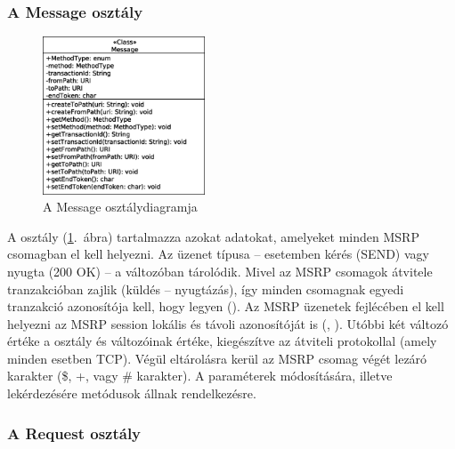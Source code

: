 \newpage
\subsubsection*{A Message osztály}
\label{sec:msrp_message}

\begin{figure}
  \vspace{-55pt}
  \begin{center}
    \includegraphics[width=0.43\textwidth]{img/class_diagrams/Message.eps}
  \end{center}
  \vspace{-15pt}
  \captionsetup{font=scriptsize}
  \caption{A Message osztálydiagramja}
   \label{fig:class_message}
  \vspace{-10pt}
\end{figure}
A  osztály (\ref{fig:class_message}.~ábra) tartalmazza azokat adatokat, amelyeket minden MSRP csomagban el kell helyezni. Az üzenet típusa -- esetemben kérés (SEND) vagy nyugta (200 OK) -- a  változóban tárolódik. Mivel az MSRP csomagok átvitele tranzakcióban zajlik (küldés -- nyugtázás), így minden csomagnak egyedi tranzakció azonosítója kell, hogy legyen (). Az MSRP üzenetek fejlécében el kell helyezni az MSRP session lokális és távoli azonosítóját is (, ). Utóbbi két változó értéke a  osztály  és  változóinak értéke, kiegészítve az átviteli protokollal (amely minden esetben TCP). Végül eltárolásra kerül az MSRP csomag végét lezáró karakter (\$, +, vagy  \# karakter). A paraméterek módosítására, illetve lekérdezésére metódusok állnak rendelkezésre.

\subsubsection*{A Request osztály}
\label{sec:msrp_request}

